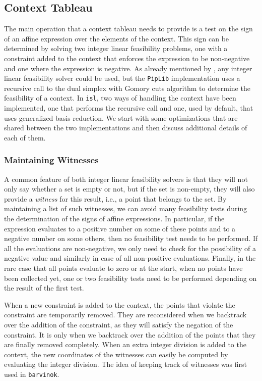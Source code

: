 \subsection{Context Tableau}\label{s:context}

The main operation that a context tableau needs to provide is a test
on the sign of an affine expression over the elements of the context.
This sign can be determined by solving two integer linear feasibility
problems, one with a constraint added to the context that enforces
the expression to be non-negative and one where the expression is
negative.  As already mentioned by ,
any integer linear feasibility solver could be used, but the {\tt PipLib}
implementation uses a recursive call to the dual simplex with Gomory
cuts algorithm to determine the feasibility of a context.
In {\tt isl}, two ways of handling the context have been implemented,
one that performs the recursive call and one, used by default, that
uses generalized basis reduction.
We start with some optimizations that are shared between the two
implementations and then discuss additional details of each of them.

\subsubsection{Maintaining Witnesses}\label{s:witness}

A common feature of both integer linear feasibility solvers is that
they will not only say whether a set is empty or not, but if the set
is non-empty, they will also provide a \emph{witness} for this result,
i.e., a point that belongs to the set.  By maintaining a list of such
witnesses, we can avoid many feasibility tests during the determination
of the signs of affine expressions.  In particular, if the expression
evaluates to a positive number on some of these points and to a negative
number on some others, then no feasibility test needs to be performed.
If all the evaluations are non-negative, we only need to check for the
possibility of a negative value and similarly in case of all
non-positive evaluations.  Finally, in the rare case that all points
evaluate to zero or at the start, when no points have been collected yet,
one or two feasibility tests need to be performed depending on the result
of the first test.

When a new constraint is added to the context, the points that
violate the constraint are temporarily removed.  They are reconsidered
when we backtrack over the addition of the constraint, as they will
satisfy the negation of the constraint.  It is only when we backtrack
over the addition of the points that they are finally removed completely.
When an extra integer division is added to the context,
the new coordinates of the
witnesses can easily be computed by evaluating the integer division.
The idea of keeping track of witnesses was first used in {\tt barvinok}.

